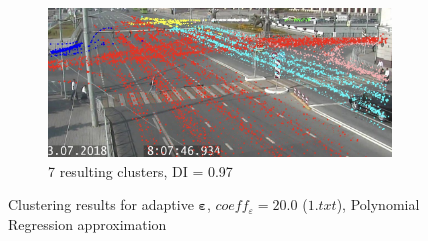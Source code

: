 \begin{figure}[!htb]
\begin{subfigure}[!htb]{0.495\textwidth}
	\end{subfigure}
	\hfill
	\begin{subfigure}[!htb]{0.495\textwidth}
		\centering{}
		\includegraphics[width=\textwidth]{images/7cl-di-1.jpeg}
		\caption{7 resulting clusters, DI = 0.97}
		\label{fig:7cl-di-1}
	\end{subfigure}
	\caption{Clustering results for adaptive $\bm{\varepsilon}$, $coeff_\varepsilon = 20.0$ ($1.txt$), Polynomial Regression approximation}
	\label{fig:clust-res-1}
\end{figure}

